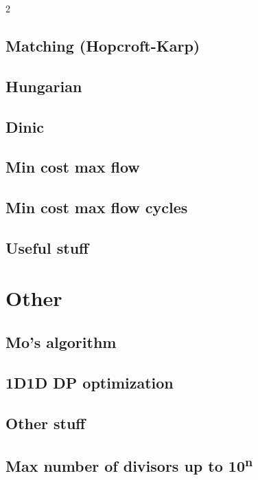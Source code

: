 \begin{multicols}{2}
\subsection{Matching (Hopcroft-Karp)}

\subsection{Hungarian}

\subsection{Dinic}

\subsection{Min cost max flow}

\subsection{Min cost max flow cycles}

\subsection{Useful stuff}



\section{Other}

\subsection{Mo's algorithm}

\subsection{1D1D DP optimization}

\subsection{Other stuff}

\subsection{Max number of divisors up to 10\textsuperscript{n}}


\end{multicols}
